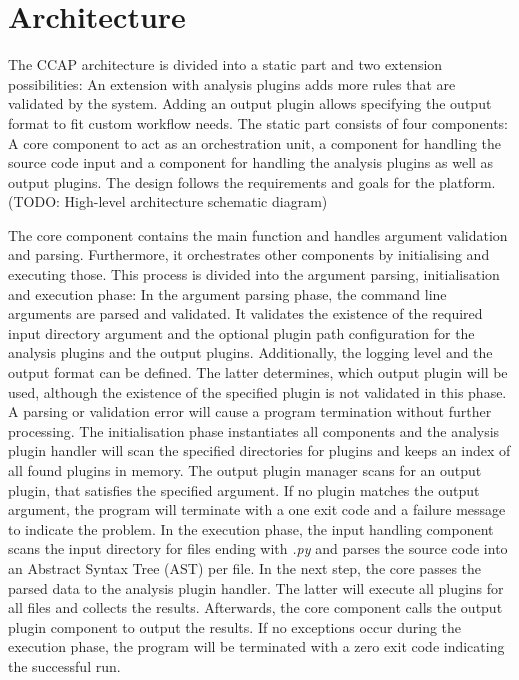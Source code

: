 \section{Architecture}
The CCAP architecture is divided into a static part and two extension possibilities: An extension with analysis plugins adds more rules that are validated by the system. Adding an output plugin allows specifying the output format to fit custom workflow needs.
The static part consists of four components: A core component to act as an orchestration unit, a  component for handling the source code input and a component for handling the analysis plugins as well as output plugins. The design follows the requirements and goals for the platform. 
(TODO: High-level architecture schematic diagram)

The core component contains the main function and handles argument validation and parsing. Furthermore, it orchestrates other components by initialising and executing those. This process is divided into the argument parsing, initialisation and execution phase:
In the argument parsing phase, the command line arguments are parsed and validated. It validates the existence of the required input directory argument and the optional plugin path configuration for the analysis plugins and the output plugins. Additionally, the logging level and the output format can be defined. The latter determines, which output plugin will be used, although the existence of the specified plugin is not validated in this phase. A parsing or validation error will cause a program termination without further processing.
The initialisation phase instantiates all components and the analysis plugin handler will scan the specified directories for plugins and keeps an index of all found plugins in memory. The output plugin manager scans for an output plugin, that satisfies the specified argument. If no plugin matches the output argument, the program will terminate with a one exit code and a failure message to indicate the problem.
In the execution phase, the input handling component scans the input directory for files ending with \textit{.py} and parses the source code into an Abstract Syntax Tree (AST) per file. In the next step, the core passes the parsed data to the analysis plugin handler. The latter will execute all plugins for all files and collects the results. Afterwards, the core component calls the output plugin component to output the results. If no exceptions occur during the execution phase, the program will be terminated with a zero exit code indicating the successful run.

